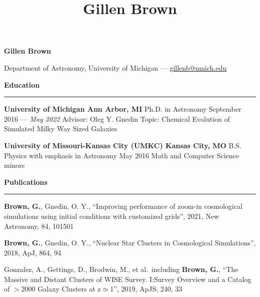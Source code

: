 \documentclass[10pt]{article}
\title{Gillen Brown}
\newcommand{\header}[1]{\vspace{2em}\par \textbf{\large #1}\strut\hrule\vspace{0em}}
\newcommand{\actionHeader}[2]{\textbf{#1 \hfill #2}}
\newcommand{\indentedItemDate}[2]{\newline\null\qquad #1 \hfill #2}
\newcommand{\indentedItem}[1]{\newline\null\qquad #1}
\begin{document}
\thispagestyle{empty}


\begin{center}
{\huge \bf Gillen Brown}

Department of Astronomy, University of Michigan ---  \href{mailto:gillenb@umich.edu}{gillenb@umich.edu} 
\end{center}
\bigskip



\header{Education}
\actionHeader{University of Michigan}{Ann Arbor, MI}
\indentedItemDate{Ph.D. in Astronomy}{September 2016 --- {\it May 2022\/}}
\indentedItem{Advisor: Oleg Y. Gnedin} 
\indentedItem{Topic: Chemical Evolution of Simulated Milky Way Sized Galaxies}

\actionHeader{University of Missouri-Kansas City (UMKC)}{Kansas City, MO}
\indentedItemDate{B.S. Physics with emphasis in Astronomy}{May 2016}
\indentedItem{Math and Computer Science minors}

\header{Publications}
\begin{etaremune}
    \item \textbf{Brown, G.}, Gnedin, O. Y.,  ``Improving performance of zoom-in cosmological simulations using initial conditions with customized grids'', 2021, New Astronomy, 84, 101501
    \item \textbf{Brown, G.}, Gnedin, O. Y.,  ``Nuclear Star Clusters in Cosmological Simulations'', 2018, ApJ, 864, 94
    \item Gonzalez, A., Gettings, D., Brodwin, M., et al.\ including \textbf{Brown, G.}, ``The Massive and Distant Clusters of WISE Survey. I:\@ Survey Overview and a Catalog of $>$2000 Galaxy Clusters at z$\simeq$1'', 2019, ApJS, 240, 33
\end{etaremune}
\end{document}
